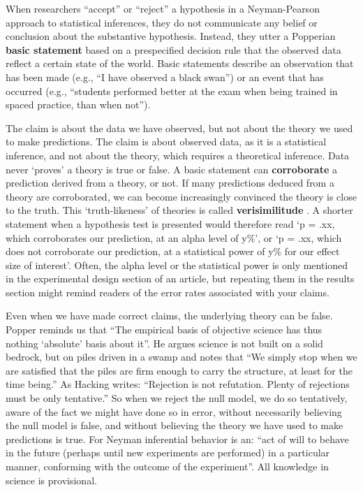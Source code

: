 \documentclass[
  oneside]{krantz}
\begin{document}
When researchers ``accept'' or ``reject'' a hypothesis in a Neyman-Pearson approach to statistical inferences, they do not communicate any belief or conclusion about the substantive hypothesis. Instead, they utter a Popperian \textbf{basic statement} based on a prespecified decision rule that the observed data reflect a certain state of the world. Basic statements describe an observation that has been made (e.g., ``I have observed a black swan'') or an event that has occurred (e.g., ``students performed better at the exam when being trained in spaced practice, than when not'').

The claim is about the data we have observed, but not about the theory we used to make predictions. The claim is about observed data, as it is a statistical inference, and not about the theory, which requires a theoretical inference. Data never `proves' a theory is true or false. A basic statement can \textbf{corroborate} a prediction derived from a theory, or not. If many predictions deduced from a theory are corroborated, we can become increasingly convinced the theory is close to the truth. This `truth-likeness' of theories is called \textbf{verisimilitude} \citep{niiniluoto_verisimilitude_1998, popper_logic_2002}. A shorter statement when a hypothesis test is presented would therefore read `p = .xx, which corroborates our prediction, at an alpha level of y\%', or `p = .xx, which does not corroborate our prediction, at a statistical power of y\% for our effect size of interest'. Often, the alpha level or the statistical power is only mentioned in the experimental design section of an article, but repeating them in the results section might remind readers of the error rates associated with your claims.

Even when we have made correct claims, the underlying theory can be false. Popper \citeyearpar{popper_logic_2002} reminds us that ``The empirical basis of objective science has thus nothing `absolute' basis about it''. He argues science is not built on a solid bedrock, but on piles driven in a swamp and notes that ``We simply stop when we are satisfied that the piles are firm enough to carry the structure, at least for the time being.'' As Hacking \citeyearpar{hacking_logic_1965} writes: ``Rejection is not refutation. Plenty of rejections must be only tentative.'' So when we reject the null model, we do so tentatively, aware of the fact we might have done so in error, without necessarily believing the null model is false, and without believing the theory we have used to make predictions is true. For Neyman \citeyearpar{neyman_inductive_1957} inferential behavior is an: ``act of will to behave in the future (perhaps until new experiments are performed) in a particular manner, conforming with the outcome of the experiment''. All knowledge in science is provisional.
\end{document}
